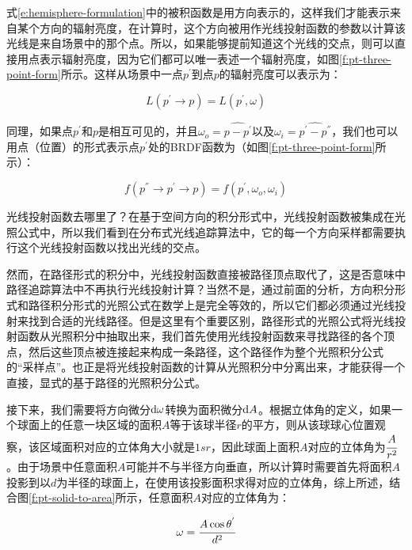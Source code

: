 式\ref{e:hemisphere-formulation}中的被积函数是用方向表示的，这样我们才能表示来自某个方向的辐射亮度，在计算时，这个方向被用作光线投射函数的参数以计算该光线是来自场景中的那个点。所以，如果能够提前知道这个光线的交点，则可以直接用点表示辐射亮度，因为它们都可以唯一表述一个辐射亮度，如图\ref{f:pt-three-point-form}所示。这样从场景中一点$p^{'}$到点$p$的辐射亮度可以表示为：

\begin{equation*}
	L(p^{'}\to p)=L(p^{'},\omega)
\end{equation*}

同理，如果点$p^{'}$和$p$是相互可见的，并且$\omega_o=\widehat{p-p^{'}}$以及$\omega_i=\widehat{p^{'}-p^{''}}$，我们也可以用点（位置）的形式表示点$p^{'}$处的BRDF函数为（如图\ref{f:pt-three-point-form}所示）：

\begin{equation*}
	f(p^{''}\to p^{'}\to p)=f(p^{'},\omega_o,\omega_i)
\end{equation*}

\begin{myshaded}
	光线投射函数去哪里了？在基于空间方向的积分形式中，光线投射函数被集成在光照公式中，所以我们看到在分布式光线追踪算法中，它的每一个方向采样都需要执行这个光线投射函数以找出光线的交点。
	
	\indent 然而，在路径形式的积分中，光线投射函数直接被路径顶点取代了，这是否意味中路径追踪算法中不再执行光线投射计算？当然不是，通过前面的分析，方向积分形式和路径积分形式的光照公式在数学上是完全等效的，所以它们都必须通过光线投射来找到合适的光线路径。但是这里有个重要区别，路径形式的光照公式将光线投射函数从光照积分中抽取出来，我们首先使用光线投射函数来寻找路径的各个顶点，然后这些顶点被连接起来构成一条路径，这个路径作为整个光照积分公式的“采样点”。也正是将光线投射函数的计算从光照积分中分离出来，才能获得一个直接，显式的基于路径的光照积分公式。
\end{myshaded}

接下来，我们需要将方向微分${\rm d}\omega$转换为面积微分${\rm d}A$。根据立体角的定义，如果一个球面上的任意一块区域的面积$A$等于该球半径$r$的平方，则从该球球心位置观察，该区域面积对应的立体角大小就是$1sr$，因此球面上面积$A$对应的立体角为$ \cfrac{A}{r^{2}}$。由于场景中任意面积$A$可能并不与半径方向垂直，所以计算时需要首先将面积$A$投影到以$d$为半径的球面上，在使用该投影面积求得对应的立体角，综上所述，结合图\ref{f:pt-solid-to-area}所示，任意面积$A$对应的立体角为：

\begin{equation}
	\omega= \cfrac{A\cos{\theta^{'}}}{d^2}
\end{equation}

